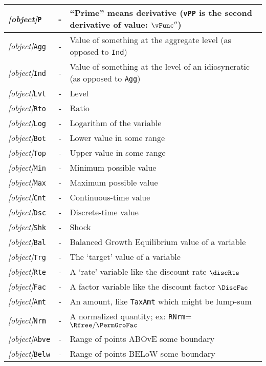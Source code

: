\documentclass[12pt]{\econtex}
\begin{document}
\begin{table}[ht]
  \centering
  \begin{tabular}{|>{\ttfamily}lcl|}
    \hline
 \textit{[object]}\texttt{P} & - & ``Prime'' means derivative (\texttt{vPP} is the second derivative of value: $\vFunc^{\prime\prime}$)
\\    \hline
    \textit{[object]}\texttt{Agg} & - & Value of something at the aggregate level (as opposed to \texttt{Ind})
    \\ \textit{[object]}\texttt{Ind} & - & Value of something at the level of an idiosyncratic (as opposed to \texttt{Agg})
    \\ \textit{[object]}\texttt{Lvl} & - & Level 
    \\ \textit{[object]}\texttt{Rto} & - & Ratio 
    \\ \textit{[object]}\texttt{Log} & - & Logarithm of the variable
    \\ \textit{[object]}\texttt{Bot} & - & Lower value in some range 
    \\ \textit{[object]}\texttt{Top} & - & Upper value in some range 
    \\ \textit{[object]}\texttt{Min} & - & Minimum possible value 
    \\ \textit{[object]}\texttt{Max} & - & Maximum possible value 
    \\ \textit{[object]}\texttt{Cnt} & - & Continuous-time value
    \\ \textit{[object]}\texttt{Dsc} & - & Discrete-time value
    \\ \textit{[object]}\texttt{Shk} & - & Shock 
    \\ \textit{[object]}\texttt{Bal} & - & Balanced Growth Equilibrium value of a variable
    \\ \textit{[object]}\texttt{Trg} & - & The `target' value of a variable 
    \\ \textit{[object]}\texttt{Rte} & - & A `rate' variable like the discount rate $\discRte$
    \\ \textit{[object]}\texttt{Fac} & - & A factor variable like the discount factor $\DiscFac$
    \\ \textit{[object]}\texttt{Amt} & - & An amount, like \texttt{TaxAmt} which might be lump-sum
    \\ \textit{[object]}\texttt{Nrm} & - & A normalized quantity; ex: \texttt{RNrm}=$\Rfree/\PermGroFac$
    \\ \textit{[object]}\texttt{Abve} & - & Range of points ABOvE some boundary
    \\ \textit{[object]}\texttt{Belw} & - & Range of points BELoW some boundary

\end{tabular}
\end{table}
\end{document}
